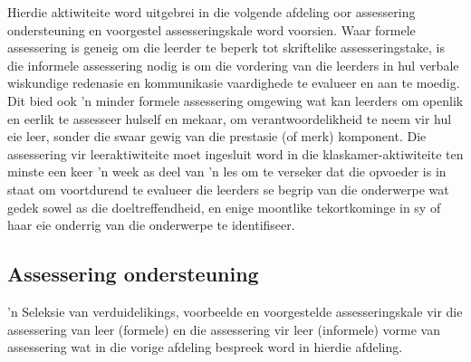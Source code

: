 Hierdie aktiwiteite word uitgebrei in die volgende afdeling oor assessering ondersteuning en voorgestel assesseringskale word voorsien. Waar formele assessering is geneig om die leerder te beperk tot skriftelike assesseringstake, is die informele assessering nodig is om die vordering van die leerders in hul verbale wiskundige redenasie en kommunikasie vaardighede te evalueer en aan te moedig. Dit bied ook 'n minder formele assessering omgewing wat kan leerders om openlik en eerlik te assesseer hulself en mekaar, om verantwoordelikheid te neem vir hul eie leer, sonder die swaar gewig van die prestasie (of merk) komponent. Die assessering vir leeraktiwiteite moet ingesluit word in die klaskamer-aktiwiteite ten minste een keer 'n week as deel van 'n les om te verseker dat die opvoeder is in staat om voortdurend te evalueer die leerders se begrip van die onderwerpe wat gedek sowel as die doeltreffendheid, en enige moontlike tekortkominge in sy of haar eie onderrig van die onderwerpe te identifiseer.

\subsection{Assessering ondersteuning}
'n Seleksie van verduidelikings, voorbeelde en voorgestelde assesseringskale vir die assessering van leer (formele) en die assessering vir leer (informele) vorme van assessering wat in die vorige afdeling bespreek word in hierdie afdeling.

